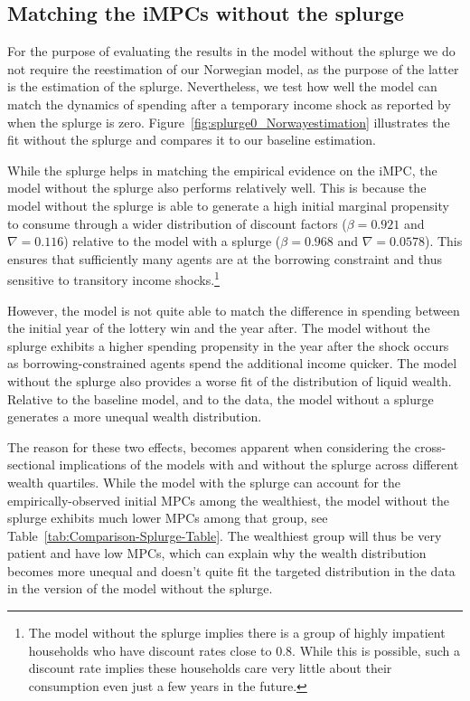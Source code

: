 \documentclass[\PathToRoot/\ProjectName]{subfiles}
\begin{document}
\subsection{Matching the iMPCs without the splurge}

For the purpose of evaluating the results in the model without the splurge we do not require the reestimation of our Norwegian model, as the purpose of the latter is the estimation of the splurge. Nevertheless, we test how well the model can match the dynamics of spending after a temporary income shock as reported by \cite{fagereng-mpc-2021} when the splurge is zero.
Figure~\ref{fig:splurge0_Norwayestimation} illustrates the fit without the splurge and compares it to our baseline estimation.



While the splurge helps in matching the empirical evidence on the iMPC, the model without the splurge also performs relatively well. This is because the model without the splurge is able to generate a high initial marginal propensity to consume through a wider distribution of discount factors ($\beta = 0.921$ and $\nabla=0.116$) relative to the model with a splurge ($\beta = 0.968$ and $\nabla=0.0578$). This ensures that sufficiently many agents are at the borrowing constraint and thus sensitive to transitory income shocks.\footnote{The model without the splurge implies there is a group of highly impatient households who have discount rates close to 0.8. While this is possible, such a discount rate implies these households care very little about their consumption even just a few years in the future.}

However, the model is not quite able to match the difference in spending between the initial year of the lottery win and the year after.
The model without the splurge exhibits a higher spending propensity in the year after the shock occurs as borrowing-constrained agents spend the additional income quicker.
The model without the splurge also provides a worse fit of the distribution of liquid wealth.
Relative to the baseline model, and to the data, the model without a splurge generates a more unequal wealth distribution.

The reason for these two effects, becomes apparent when considering the cross-sectional implications of the models with and without the splurge across different wealth quartiles.
While the model with the splurge can account for the empirically-observed initial MPCs among the wealthiest, the model without the splurge exhibits much lower MPCs among that group, see Table~\ref{tab:Comparison-Splurge-Table}. The wealthiest group will thus be very patient and have low MPCs, which can explain why the wealth distribution becomes more unequal and doesn't quite fit the targeted distribution in the data in the version of the model without the splurge.
\end{document}
